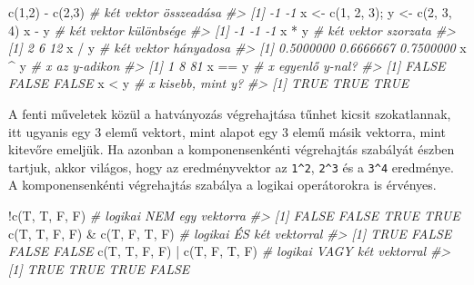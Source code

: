 \documentclass[
]{book}
\newenvironment{Shaded}{\begin{snugshade}}{\end{snugshade}}
\newcommand{\CommentTok}[1]{\textcolor[rgb]{0.56,0.35,0.01}{\textit{#1}}}
\newcommand{\DecValTok}[1]{\textcolor[rgb]{0.00,0.00,0.81}{#1}}
\newcommand{\FunctionTok}[1]{\textcolor[rgb]{0.00,0.00,0.00}{#1}}
\newcommand{\NormalTok}[1]{#1}
\newcommand{\OtherTok}[1]{\textcolor[rgb]{0.56,0.35,0.01}{#1}}
\newcommand{\SpecialCharTok}[1]{\textcolor[rgb]{0.00,0.00,0.00}{#1}}
\begin{document}
\begin{Shaded}
\begin{Highlighting}[]
\FunctionTok{c}\NormalTok{(}\DecValTok{1}\NormalTok{,}\DecValTok{2}\NormalTok{) }\SpecialCharTok{{-}} \FunctionTok{c}\NormalTok{(}\DecValTok{2}\NormalTok{,}\DecValTok{3}\NormalTok{) }\CommentTok{\# két vektor összeadása }
\CommentTok{\#\textgreater{} [1] {-}1 {-}1}
\NormalTok{x }\OtherTok{\textless{}{-}} \FunctionTok{c}\NormalTok{(}\DecValTok{1}\NormalTok{, }\DecValTok{2}\NormalTok{, }\DecValTok{3}\NormalTok{); y }\OtherTok{\textless{}{-}} \FunctionTok{c}\NormalTok{(}\DecValTok{2}\NormalTok{, }\DecValTok{3}\NormalTok{, }\DecValTok{4}\NormalTok{)}
\NormalTok{x }\SpecialCharTok{{-}}\NormalTok{ y           }\CommentTok{\# két vektor különbsége}
\CommentTok{\#\textgreater{} [1] {-}1 {-}1 {-}1}
\NormalTok{x }\SpecialCharTok{*}\NormalTok{ y           }\CommentTok{\# két vektor szorzata}
\CommentTok{\#\textgreater{} [1]  2  6 12}
\NormalTok{x }\SpecialCharTok{/}\NormalTok{ y           }\CommentTok{\# két vektor hányadosa}
\CommentTok{\#\textgreater{} [1] 0.5000000 0.6666667 0.7500000}
\NormalTok{x }\SpecialCharTok{\^{}}\NormalTok{ y           }\CommentTok{\# x az y{-}adikon}
\CommentTok{\#\textgreater{} [1]  1  8 81}
\NormalTok{x }\SpecialCharTok{==}\NormalTok{ y          }\CommentTok{\# x egyenlő y{-}nal?}
\CommentTok{\#\textgreater{} [1] FALSE FALSE FALSE}
\NormalTok{x }\SpecialCharTok{\textless{}}\NormalTok{ y           }\CommentTok{\# x kisebb, mint y?}
\CommentTok{\#\textgreater{} [1] TRUE TRUE TRUE}
\end{Highlighting}
\end{Shaded}

A fenti műveletek közül a hatványozás végrehajtása tűnhet kicsit szokatlannak, itt ugyanis egy 3 elemű vektort, mint alapot egy 3 elemű másik vektorra, mint kitevőre emeljük. Ha azonban a komponensenkénti végrehajtás szabályát észben tartjuk, akkor világos, hogy az eredményvektor az \texttt{1\^{}2}, \texttt{2\^{}3} és a \texttt{3\^{}4} eredménye.\\
A komponensenkénti végrehajtás szabálya a logikai operátorokra is érvényes.

\begin{Shaded}
\begin{Highlighting}[]
\SpecialCharTok{!}\FunctionTok{c}\NormalTok{(T, T, F, F)                 }\CommentTok{\# logikai NEM egy vektorra}
\CommentTok{\#\textgreater{} [1] FALSE FALSE  TRUE  TRUE}
\FunctionTok{c}\NormalTok{(T, T, F, F) }\SpecialCharTok{\&} \FunctionTok{c}\NormalTok{(T, F, T, F)  }\CommentTok{\# logikai ÉS két vektorral}
\CommentTok{\#\textgreater{} [1]  TRUE FALSE FALSE FALSE}
\FunctionTok{c}\NormalTok{(T, T, F, F) }\SpecialCharTok{|} \FunctionTok{c}\NormalTok{(T, F, T, F)  }\CommentTok{\# logikai VAGY két vektorral}
\CommentTok{\#\textgreater{} [1]  TRUE  TRUE  TRUE FALSE}
\end{Highlighting}
\end{Shaded}
\end{document}
